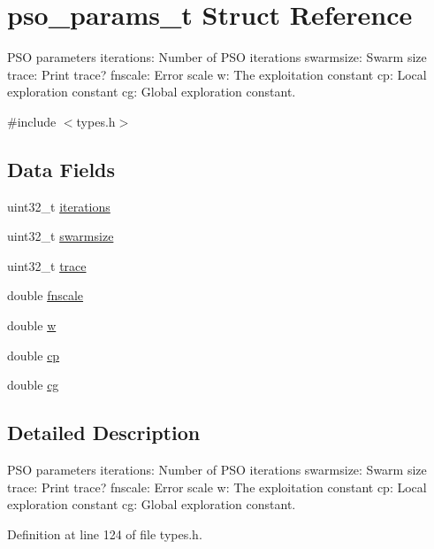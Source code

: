 \hypertarget{structpso__params__t}{\section{pso\-\_\-params\-\_\-t Struct Reference}
\label{structpso__params__t}
}


P\-S\-O parameters iterations\-: Number of P\-S\-O iterations swarmsize\-: Swarm size trace\-: Print trace? fnscale\-: Error scale w\-: The exploitation constant cp\-: Local exploration constant cg\-: Global exploration constant.  




{\ttfamily \#include $<$types.\-h$>$}

\subsection*{Data Fields}
\begin{DoxyCompactItemize}
\item 
uint32\-\_\-t \hyperlink{structpso__params__t_a09d2f0309c3f2dc43846a0f8661bf670}{iterations}
\item 
uint32\-\_\-t \hyperlink{structpso__params__t_a40e05fe53561f5e710058dbd51788313}{swarmsize}
\item 
uint32\-\_\-t \hyperlink{structpso__params__t_a58ce20f72162622bead72d5f04a66766}{trace}
\item 
double \hyperlink{structpso__params__t_a05eeec103899c3c07ab909c95145c5b1}{fnscale}
\item 
double \hyperlink{structpso__params__t_aa2ba76335888b56c05aed664d67c370f}{w}
\item 
double \hyperlink{structpso__params__t_af061551bf622b55963c8dc0075342679}{cp}
\item 
double \hyperlink{structpso__params__t_a131eaad94b334972d795146b0005865a}{cg}
\end{DoxyCompactItemize}


\subsection{Detailed Description}
P\-S\-O parameters iterations\-: Number of P\-S\-O iterations swarmsize\-: Swarm size trace\-: Print trace? fnscale\-: Error scale w\-: The exploitation constant cp\-: Local exploration constant cg\-: Global exploration constant. 

Definition at line 124 of file types.\-h.



